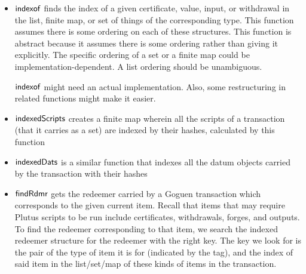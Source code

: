 \begin{itemize}
  \item $\mathsf{indexof}$ finds the index of a given certificate, value, input, or
  withdrawal in the list, finite map, or set of things of the corresponding type.
  This function assumes there is some ordering on each of these structures.
  This function is abstract because it assumes there is some ordering rather
  than giving it explicitly. The specific ordering of a set or a finite map
  could be implementation-dependent. A list ordering should be unambiguous.
  \begin{note}
    $\mathsf{indexof}$ might need an actual implementation. Also, some
    restructuring in related functions might make it easier.
  \end{note}
  \item $\mathsf{indexedScripts}$ creates a finite map wherein all the scripts
  of a transaction (that it carries as a set) are indexed by their hashes,
  calculated by this function
  \item $\mathsf{indexedDats}$ is a similar function that indexes all the datum objects
  carried by the transaction with their hashes
  \item $\mathsf{findRdmr}$ gets the redeemer carried by a Goguen transaction
   which corresponds to the given current item. Recall that items that may require
   Plutus scripts to be run include certificates, withdrawals, forges,
   and outputs. To find the redeemer corresponding to that item, we search
   the indexed redeemer structure for the redeemer with the right key.
   The key we look for is the
   pair of the type of item it is for (indicated by the tag), and the index of
   said item in the list/set/map of these kinds of items in the transaction.
\end{itemize}


